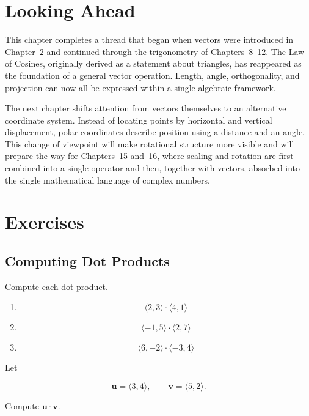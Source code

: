 \section{Looking Ahead}

This chapter completes a thread that began when vectors were introduced in
Chapter~2 and continued through the trigonometry of Chapters~8--12. The
Law of Cosines, originally derived as a statement about triangles, has
reappeared as the foundation of a general vector operation. Length,
angle, orthogonality, and projection can now all be expressed within a
single algebraic framework.

The next chapter shifts attention from vectors themselves to an
alternative coordinate system. Instead of locating points by horizontal
and vertical displacement, polar coordinates describe position using a
distance and an angle. This change of viewpoint will make rotational
structure more visible and will prepare the way for Chapters~15 and~16,
where scaling and rotation are first combined into a single operator and
then, together with vectors, absorbed into the single mathematical
language of complex numbers.

\section{Exercises}

\subsection*{Computing Dot Products}

\begin{exercise}
Compute each dot product.

\begin{enumerate}
\item[(a)]
\[
\langle 2,3\rangle\cdot\langle 4,1\rangle
\]

\item[(b)]
\[
\langle -1,5\rangle\cdot\langle 2,7\rangle
\]

\item[(c)]
\[
\langle 6,-2\rangle\cdot\langle -3,4\rangle
\]
\end{enumerate}
\end{exercise}

\begin{exercise}
Let

\[
\mathbf{u}
=
\langle 3,4\rangle,
\qquad
\mathbf{v}
=
\langle 5,2\rangle.
\]

Compute $\mathbf{u}\cdot\mathbf{v}$.
\end{exercise}

